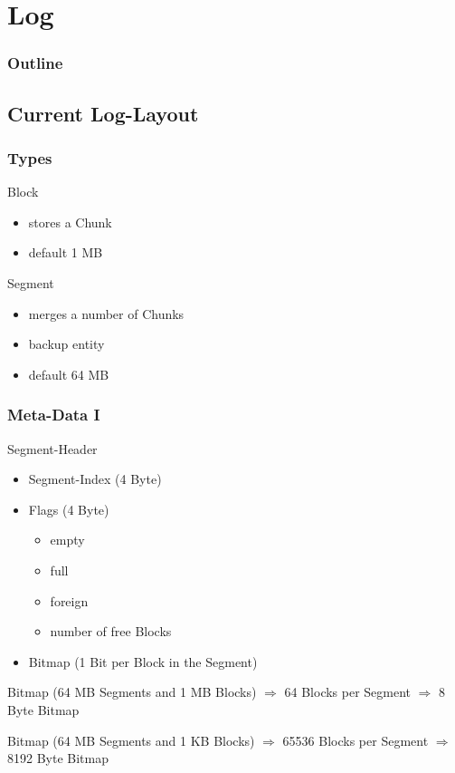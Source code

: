 \documentclass{beamer}
\begin{document}
\section{Log}

	\begin{frame}
		\frametitle{Outline}

	\end{frame}

\subsection{Current Log-Layout}

	\begin{frame}
		\frametitle{Types}

		\begin{block}{Block}
			\begin{itemize}
				\item stores a Chunk
				\item default 1 MB
			\end{itemize}
		\end{block}

		\begin{block}{Segment}
			\begin{itemize}
				\item merges a number of Chunks
				\item backup entity
				\item default 64 MB
			\end{itemize}
		\end{block}
	\end{frame}

	\begin{frame}
		\frametitle{Meta-Data I}

		\begin{block}{Segment-Header}
			\begin{itemize}
				\item Segment-Index (4 Byte)
				\item Flags (4 Byte)
					\begin{itemize}
						\item empty
						\item full
						\item foreign
						\item number of free Blocks
					\end{itemize}
				\item Bitmap (1 Bit per Block in the Segment)
			\end{itemize}
		\end{block}

		\begin{exampleblock}{Bitmap (64 MB Segments and 1 MB Blocks)}
			$\Rightarrow$ 64 Blocks per Segment
			$\Rightarrow$ 8 Byte Bitmap
		\end{exampleblock}

		\begin{exampleblock}{Bitmap (64 MB Segments and 1 KB Blocks)}
			$\Rightarrow$ 65536 Blocks per Segment
			$\Rightarrow$ 8192 Byte Bitmap
		\end{exampleblock}
	\end{frame}
\end{document}
